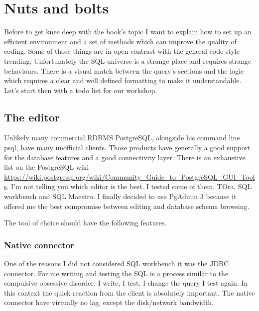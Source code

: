 \chapter{Nuts and bolts}
Before to get knee deep with the book's topic I want to explain how to set up an
efficient environment and a set of methods which can improve the quality of coding.
Some of those things are in open contrast with the general code style trending.
Unfortunately the SQL universe is a strange place and requires strange behaviours.
There is a visual match between the query's sections and the logic which requires a clear
and well defined formatting to make it understandable.\newline
Let's start then with a todo list for our workshop.
\section{The editor}
Unlikely many commercial RDBMS PostgreSQL, alongside his command line psql, have many unofficial
clients. Those products have generally a good support for the database features and  a good
connectivity layer. There is an exhaustive list on the PostgreSQL wiki\newline
\href{https://wiki.postgresql.org/wiki/Community\_Guide\_to\_PostgreSQL\_GUI\_Tools}{
https://wiki.postgresql.org/wiki/Community\_Guide\_to\_PostgreSQL\_GUI\_Tools}. I'm not telling you
which editor is the best. I tested some of them, TOra, SQL workbench and SQL Maestro. I finally
decided to use PgAdmin 3 because it offered me the best compromise between editing and database
schema browsing.\newline

The tool of choice should have the following features.

\subsection{Native connector}
One of the reasons I did not considered SQL workbench it was the JDBC connector. For me writing and
testing the SQL is a process similar to the compulsive obsessive disorder. I write, I test, I
change the query I test again. In this context the quick reaction from the client is absolutely
important. The native connector have virtually no lag, except the disk/network bandwidth.

